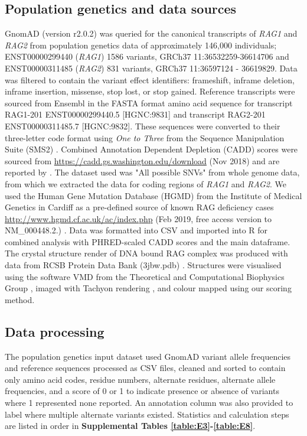 \documentclass[preprint,11pt,fleqn]{elsarticle}
\begin{document}
\subsection*{\textbf{Population genetics and data sources}}
\noindent GnomAD (version r2.0.2) \citep{lek2016analysis} was queried for the canonical transcripts of \textit{RAG1} and \textit{RAG2} from population genetics data of approximately 146,000 individuals; ENST00000299440 (\textit{RAG1}) 1586 variants, GRCh37 11:36532259-36614706 and ENST00000311485 (\textit{RAG2}) 831 variants, GRCh37 11:36597124 - 36619829. 
Data was filtered to contain the variant effect identifiers: frameshift, inframe deletion, inframe insertion, missense, stop lost, or stop gained. 
Reference transcripts were sourced from Ensembl in the FASTA format amino acid sequence for transcript RAG1-201 ENST00000299440.5 [HGNC:9831] and transcript RAG2-201 ENST00000311485.7 [HGNC:9832]. 
These sequences were converted to their three-letter code format using \textit{One to Three} from the Sequence Manipulation Suite (SMS2)
\citep{stothard2000sequence}.
Combined Annotation Dependent Depletion (CADD) scores were sourced from 
\hyperref[https://cadd.gs.washington.edu/download]{https://cadd.gs.washington.edu/download} (Nov 2018)
and are reported by \citet{kircher2014general}.
The dataset used was "All possible SNVs" from whole genome data, from which we extracted the data for coding regions of \textit{RAG1} and \textit{RAG2}.
We used the Human Gene Mutation Database (HGMD) from the Institute of Medical Genetics in Cardiff as a pre-defined source of known RAG deficiency cases 
\hyperref[http://www.hgmd.cf.ac.uk/ac/index.php]{http://www.hgmd.cf.ac.uk/ac/index.php} (Feb 2019, free access version to NM\_000448.2.)
\citep{stenson2014human}.
Data was formatted into CSV and imported into R for combined analysis with PHRED-scaled CADD scores and the main dataframe. 
The crystal structure render of DNA bound RAG complex was produced with data from RCSB Protein Data Bank (3jbw.pdb)
\citep{ru2015molecular}.
Structures were visualised using the software VMD from the Theoretical and Computational Biophysics Group
\citep{Humphrey1996vmd},
imaged with Tachyon rendering 
\citep{Stone1998Ane}, and colour mapped using our scoring method. 

\subsection*{\textbf{Data processing}}
\noindent The population genetics input dataset used GnomAD variant allele frequencies and reference sequences processed as CSV files, cleaned and sorted to contain only amino acid codes, residue numbers, alternate residues, alternate allele frequencies, and a score of 0 or 1 to indicate presence or absence of variants where 1 represented none reported. 
An annotation column was also provided to label where multiple alternate variants existed. Statistics and calculation steps are listed in order in 
\textbf{Supplemental Tables \ref{table:E3}-\ref{table:E8}}.
\end{document}
